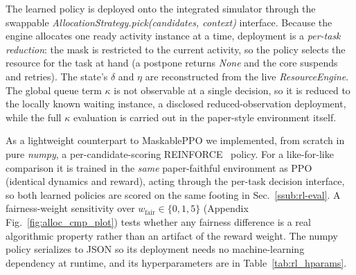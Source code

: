 The learned policy is deployed onto the integrated simulator through the swappable
\emph{AllocationStrategy.pick(candidates, context)} interface. Because the engine allocates one
ready activity instance at a time, deployment is a \emph{per-task reduction}: the mask is
restricted to the current activity, so the policy selects the resource for the task at hand (a
postpone returns \emph{None} and the core suspends and retries). The state's $\delta$ and
$\eta$ are reconstructed from the live \emph{ResourceEngine}. The global queue term $\kappa$ is
not observable at a single decision, so it is reduced to the locally known waiting instance,
a disclosed reduced-observation deployment, while the full $\kappa$ evaluation is carried out in
the paper-style environment itself.

As a lightweight counterpart to MaskablePPO we implemented, from scratch in pure \emph{numpy}, a
per-candidate-scoring REINFORCE~\cite{williams1992reinforce, sutton2018rl} policy. For a
like-for-like comparison it is trained in the \emph{same} paper-faithful environment as PPO
(identical dynamics and reward), acting through the per-task decision interface, so both learned
policies are scored on the same footing in Sec.~\ref{ssub:rl-eval}. A
fairness-weight sensitivity over $w_{\mathrm{fair}}\in\{0,1,5\}$ (Appendix
Fig.~\ref{fig:alloc_cmp_plot}) tests whether any fairness difference is a real algorithmic property
rather than an artifact of the reward weight. The numpy policy serializes to JSON so its deployment
needs no machine-learning dependency at runtime, and its hyperparameters are in
Table~\ref{tab:rl_hparams}.
